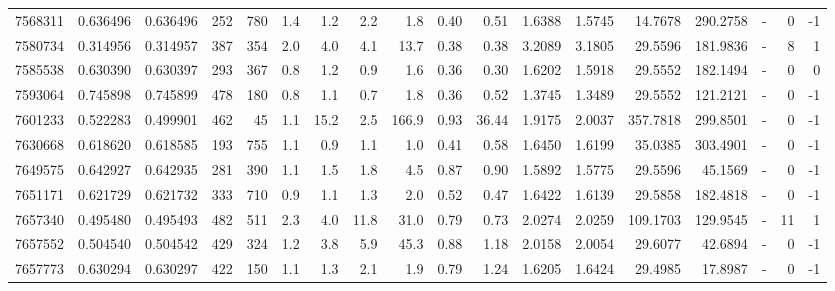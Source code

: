 \begin{tabular}{rrrrrrrrrrrrrrrlrr}
   7568311 & 0.636496 &   0.636496 &  252 &  780 &      1.4 &      1.2 &     2.2 &      1.8 &       0.40 &        0.51 &  1.6388 &  1.5745 &   14.7678 &  290.2758 &             - &        0 &         -1 \\
   7580734 & 0.314956 &   0.314957 &  387 &  354 &      2.0 &      4.0 &     4.1 &     13.7 &       0.38 &        0.38 &  3.2089 &  3.1805 &   29.5596 &  181.9836 &             - &        8 &          1 \\
   7585538 & 0.630390 &   0.630397 &  293 &  367 &      0.8 &      1.2 &     0.9 &      1.6 &       0.36 &        0.30 &  1.6202 &  1.5918 &   29.5552 &  182.1494 &             - &        0 &          0 \\
   7593064 & 0.745898 &   0.745899 &  478 &  180 &      0.8 &      1.1 &     0.7 &      1.8 &       0.36 &        0.52 &  1.3745 &  1.3489 &   29.5552 &  121.2121 &             - &        0 &         -1 \\
   7601233 & 0.522283 &   0.499901 &  462 &   45 &      1.1 &     15.2 &     2.5 &    166.9 &       0.93 &       36.44 &  1.9175 &  2.0037 &  357.7818 &  299.8501 &             - &        0 &         -1 \\
   7630668 & 0.618620 &   0.618585 &  193 &  755 &      1.1 &      0.9 &     1.1 &      1.0 &       0.41 &        0.58 &  1.6450 &  1.6199 &   35.0385 &  303.4901 &             - &        0 &         -1 \\
   7649575 & 0.642927 &   0.642935 &  281 &  390 &      1.1 &      1.5 &     1.8 &      4.5 &       0.87 &        0.90 &  1.5892 &  1.5775 &   29.5596 &   45.1569 &             - &        0 &         -1 \\
   7651171 & 0.621729 &   0.621732 &  333 &  710 &      0.9 &      1.1 &     1.3 &      2.0 &       0.52 &        0.47 &  1.6422 &  1.6139 &   29.5858 &  182.4818 &             - &        0 &         -1 \\
   7657340 & 0.495480 &   0.495493 &  482 &  511 &      2.3 &      4.0 &    11.8 &     31.0 &       0.79 &        0.73 &  2.0274 &  2.0259 &  109.1703 &  129.9545 &             - &       11 &          1 \\
   7657552 & 0.504540 &   0.504542 &  429 &  324 &      1.2 &      3.8 &     5.9 &     45.3 &       0.88 &        1.18 &  2.0158 &  2.0054 &   29.6077 &   42.6894 &             - &        0 &         -1 \\
   7657773 & 0.630294 &   0.630297 &  422 &  150 &      1.1 &      1.3 &     2.1 &      1.9 &       0.79 &        1.24 &  1.6205 &  1.6424 &   29.4985 &   17.8987 &             - &        0 &         -1 \\

\end{tabular}
